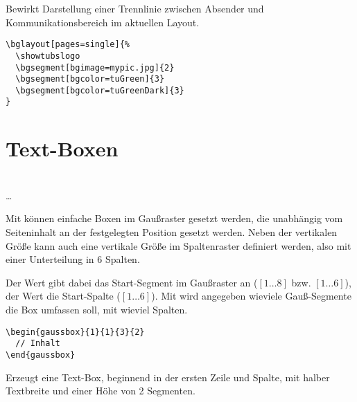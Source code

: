 \vspace*{-5mm}
\begin{Declaration}
\end{Declaration}

Bewirkt Darstellung einer Trennlinie zwischen Absender und Kommunikationsbereich
im aktuellen Layout.

\begin{lstlisting}[captionpos=b,caption={Beispiel-Nutzung von bglayout}]
\bglayout[pages=single]{%
  \showtubslogo
  \bgsegment[bgimage=mypic.jpg]{2}
  \bgsegment[bgcolor=tuGreen]{3}
  \bgsegment[bgcolor=tuGreenDark]{3}
}
\end{lstlisting}


\section{Text-Boxen}

\begin{Declaration}
          \\
  \quad\dots\\
\end{Declaration}

Mit  können einfache Boxen im Gaußraster gesetzt werden,
die unabhängig vom Seiteninhalt an der festgelegten Position gesetzt werden.
Neben der vertikalen Größe kann auch eine vertikale Größe im Spaltenraster
definiert werden, also mit einer Unterteilung in 6 Spalten.

Der Wert  gibt dabei das Start-Segment im Gaußraster an
($[1\ldots 8]$ bzw. $[1\ldots6]$),
der Wert  die Start-Spalte ($[1\ldots6]$).
Mit  wird angegeben wieviele Gauß-Segmente die Box umfassen soll,
mit  wieviel Spalten.

\begin{example}
  \begin{lstlisting}
\begin{gaussbox}{1}{1}{3}{2}
  // Inhalt
\end{gaussbox}
  \end{lstlisting}
  Erzeugt eine Text-Box, beginnend in der ersten Zeile und Spalte,
  mit halber Textbreite und einer Höhe von 2 Segmenten.
\end{example}

